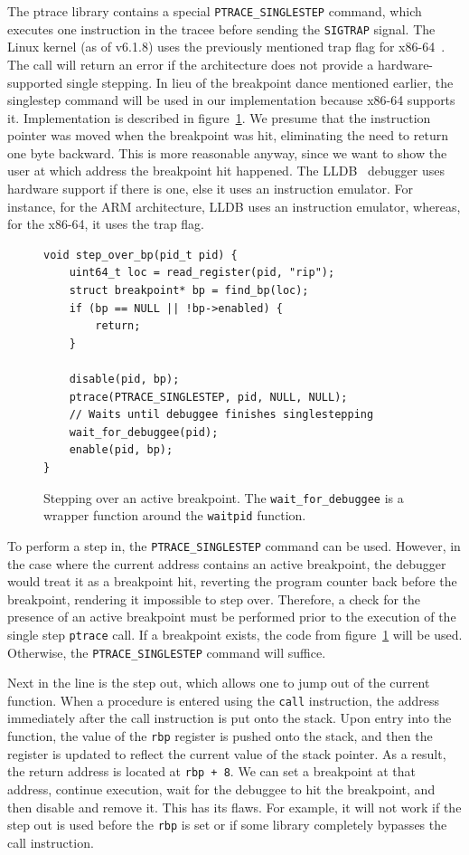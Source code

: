 The ptrace library contains a special \texttt{PTRACE\_SINGLESTEP} command,
which executes one instruction in the tracee before sending the
\texttt{SIGTRAP} signal. The Linux kernel (as of v6.1.8) uses the previously
mentioned trap flag for x86-64~\cite{linuxkernel-trapflag}. The call will
return an error if the architecture does not provide a hardware-supported
single stepping. In lieu of the breakpoint dance mentioned earlier, the
singlestep command will be used in our implementation because x86-64 supports
it. Implementation is described in figure~\ref{fig:singlestep}. We presume that
the instruction pointer was moved when the breakpoint was hit, eliminating the
need to return one byte backward. This is more reasonable anyway, since we want
to show the user at which address the breakpoint hit happened. The
LLDB~\cite{lldb} debugger uses hardware support if there is one, else it uses
an instruction emulator. For instance, for the ARM architecture, LLDB uses an
instruction emulator, whereas, for the x86-64, it uses the trap flag.

\begin{figure}
    \begin{verbatim}
void step_over_bp(pid_t pid) {
    uint64_t loc = read_register(pid, "rip");
    struct breakpoint* bp = find_bp(loc);
    if (bp == NULL || !bp->enabled) {
        return;
    }

    disable(pid, bp);
    ptrace(PTRACE_SINGLESTEP, pid, NULL, NULL);
    // Waits until debuggee finishes singlestepping
    wait_for_debuggee(pid);
    enable(pid, bp);
}
    \end{verbatim}
    \caption{Stepping over an active breakpoint. The \texttt{wait\_for\_debuggee}
    is a wrapper function around the \texttt{waitpid} function.}
    \label{fig:singlestep}
\end{figure}

To perform a step in, the \verb|PTRACE_SINGLESTEP| command can be used.
However, in the case where the current address contains an active breakpoint,
the debugger would treat it as a breakpoint hit, reverting the program counter
back before the breakpoint, rendering it impossible to step over. Therefore, a
check for the presence of an active breakpoint must be performed prior to the
execution of the single step \texttt{ptrace} call. If a breakpoint exists, the
code from figure~\ref{fig:singlestep} will be used. Otherwise, the
\verb|PTRACE_SINGLESTEP| command will suffice.

Next in the line is the step out, which allows one to jump out of the current
function. When a procedure is entered using the \texttt{call} instruction, the
address immediately after the call instruction is put onto the stack. Upon
entry into the function, the value of the \texttt{rbp} register is pushed onto
the stack, and then the register is updated to reflect the current value of the
stack pointer. As a result, the return address is located at \texttt{rbp + 8}.
We can set a breakpoint at that address, continue execution, wait for the
debuggee to hit the breakpoint, and then disable and remove it. This has its
flaws. For example, it will not work if the step out is used before the
\texttt{rbp} is set or if some library completely bypasses the call
instruction.

